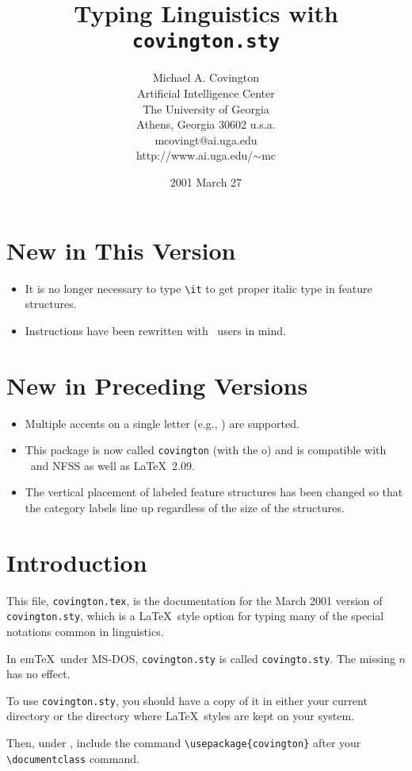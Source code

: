 \documentclass{article}
\title{\bf Typing Linguistics with {\tt covington.sty}}
\author{Michael A. Covington \\
        \small Artificial Intelligence Center \\
        \small The University of Georgia \\
        \small Athens, Georgia 30602 \sc u.s.a.\\
        mcovingt@ai.uga.edu\\
	http://www.ai.uga.edu/$\sim$mc}
\date{2001 March 27}
\begin{document}
\maketitle
{\footnotesize \tableofcontents}

\section*{New in This Version}
\begin{itemize}
\item It is no longer necessary to type \verb"\it" to get proper italic type in feature structures.
\item Instructions have been rewritten with \LaTeXe\ users in mind.
\end{itemize}

\section*{New in Preceding Versions}
\begin{itemize}
\item Multiple accents on a single letter (e.g., \emph{}) are supported.
\item This package is now called {\tt covington} (with the o)
and is compatible with \LaTeXe\ and NFSS as well as \LaTeX\ 2.09.
\item The vertical placement of labeled feature structures has 
been changed
so that the category labels line up regardless of the size of
the structures.
\end{itemize}

\section*{Introduction}
This file, {\tt covington.tex}, is the documentation for the 
March 2001 version of {\tt covington.sty}, which is a \LaTeX\ style 
option for typing many of the special notations common in linguistics.

{\footnotesize 
In em\TeX\ under MS-DOS, {\tt covington.sty} is called {\tt covingto.sty}.
The missing $n$ has no effect.}

To use {\tt covington.sty}, you should have a copy of it in either your
current directory or the directory where \LaTeX\ styles are kept on your 
system.

Then, under \LaTeXe,
include the command
\verb"\usepackage{covington}"
after your \verb"\documentclass" command.
\end{document}
